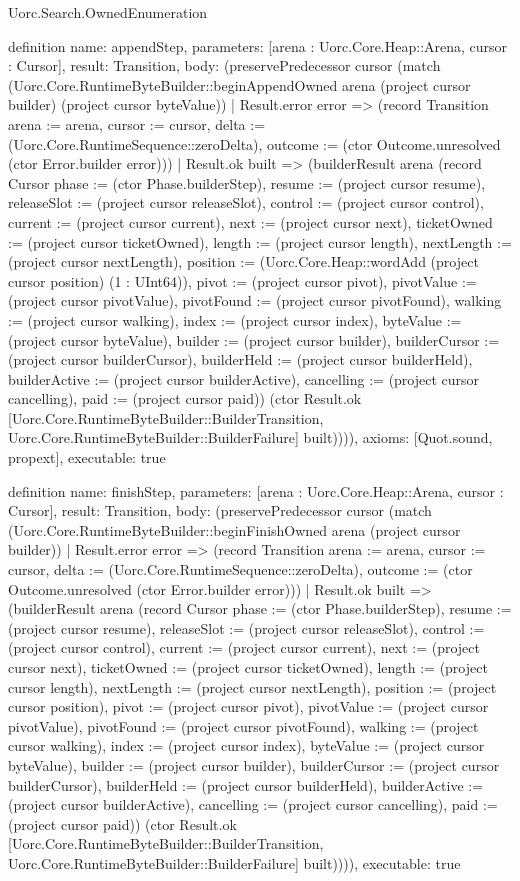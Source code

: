 \begin{lexlean}{Uorc.Search.OwnedEnumeration}
\begin{semanticmodule}
definition{
  name: appendStep,
  parameters: [arena : Uorc.Core.Heap::Arena, cursor : Cursor],
  result: Transition,
  body: (preservePredecessor cursor (match (Uorc.Core.RuntimeByteBuilder::beginAppendOwned arena (project cursor builder) (project cursor byteValue))
    | Result.error error => (record Transition {arena := arena, cursor := cursor, delta := (Uorc.Core.RuntimeSequence::zeroDelta), outcome := (ctor Outcome.unresolved (ctor Error.builder error))})
    | Result.ok built => (builderResult arena (record Cursor {phase := (ctor Phase.builderStep), resume := (project cursor resume), releaseSlot := (project cursor releaseSlot), control := (project cursor control), current := (project cursor current), next := (project cursor next), ticketOwned := (project cursor ticketOwned), length := (project cursor length), nextLength := (project cursor nextLength), position := (Uorc.Core.Heap::wordAdd (project cursor position) (1 : UInt64)), pivot := (project cursor pivot), pivotValue := (project cursor pivotValue), pivotFound := (project cursor pivotFound), walking := (project cursor walking), index := (project cursor index), byteValue := (project cursor byteValue), builder := (project cursor builder), builderCursor := (project cursor builderCursor), builderHeld := (project cursor builderHeld), builderActive := (project cursor builderActive), cancelling := (project cursor cancelling), paid := (project cursor paid)}) (ctor Result.ok [Uorc.Core.RuntimeByteBuilder::BuilderTransition, Uorc.Core.RuntimeByteBuilder::BuilderFailure] built)))),
  axioms: [Quot.sound, propext],
  executable: true
}

definition{
  name: finishStep,
  parameters: [arena : Uorc.Core.Heap::Arena, cursor : Cursor],
  result: Transition,
  body: (preservePredecessor cursor (match (Uorc.Core.RuntimeByteBuilder::beginFinishOwned arena (project cursor builder))
    | Result.error error => (record Transition {arena := arena, cursor := cursor, delta := (Uorc.Core.RuntimeSequence::zeroDelta), outcome := (ctor Outcome.unresolved (ctor Error.builder error))})
    | Result.ok built => (builderResult arena (record Cursor {phase := (ctor Phase.builderStep), resume := (project cursor resume), releaseSlot := (project cursor releaseSlot), control := (project cursor control), current := (project cursor current), next := (project cursor next), ticketOwned := (project cursor ticketOwned), length := (project cursor length), nextLength := (project cursor nextLength), position := (project cursor position), pivot := (project cursor pivot), pivotValue := (project cursor pivotValue), pivotFound := (project cursor pivotFound), walking := (project cursor walking), index := (project cursor index), byteValue := (project cursor byteValue), builder := (project cursor builder), builderCursor := (project cursor builderCursor), builderHeld := (project cursor builderHeld), builderActive := (project cursor builderActive), cancelling := (project cursor cancelling), paid := (project cursor paid)}) (ctor Result.ok [Uorc.Core.RuntimeByteBuilder::BuilderTransition, Uorc.Core.RuntimeByteBuilder::BuilderFailure] built)))),
  executable: true
}


\end{semanticmodule}
\end{lexlean}
